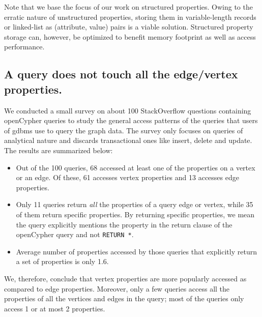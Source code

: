 Note that we base the focus of our work on structured properties. Owing to the erratic nature of unstructured properties, storing them in variable-length records or linked-list as (attribute, value) pairs is a viable solution. Structured property storage can, however, be optimized to benefit memory footprint as well as access performance.

\subsection{A query does not touch all the edge/vertex properties.}

We conducted a small survey on about 100 StackOverflow questions containing openCypher queries to study the general access patterns of the queries that users of \gls{gdbms} use to query the graph data. The survey only focuses on queries of analytical nature and discards transactional ones like insert, delete and update. The results are summarized below: 

\begin{itemize}
	
	\item Out of the 100 queries, 68 accessed at least one of the properties on a vertex or an edge. Of these, 61 accesses vertex properties and 13 accesses edge properties.
	
	\item Only 11 queries return \emph{all} the properties of a query edge or vertex, while 35 of them return specific properties. By returning specific properties, we mean the query explicitly mentions the property in the return clause of the openCypher query and not \texttt{{\color{cstm-org}RETURN} *}.
	
	\item Average number of properties accessed by those queries that explicitly return a set of properties is only 1.6.
	
\end{itemize}

We, therefore, conclude that vertex properties are more popularly accessed as compared to edge properties. Moreover, only a few queries access all the properties of all the vertices and edges in the query; most of the queries only access 1 or at most 2 properties.
